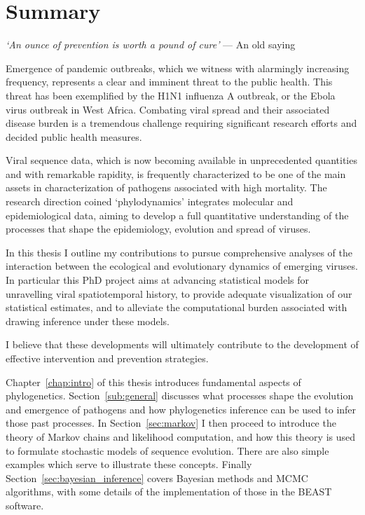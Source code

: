
\chapter*{Summary}

\bigskip{}

\emph{`An ounce of prevention is worth a pound  of cure'}
--- An old saying

\bigskip{}

Emergence of pandemic outbreaks, which we witness with alarmingly increasing frequency, represents a clear and imminent threat to the public health. 
This threat has been exemplified by the H1N1 influenza A outbreak, or the Ebola virus outbreak in West Africa.
Combating viral spread and their associated disease burden is a tremendous challenge requiring significant research efforts and decided public health measures. 

Viral sequence data, which is now becoming available in unprecedented quantities and with remarkable rapidity, is frequently characterized to be one of the main assets in characterization of pathogens associated with high mortality. 
The research direction coined `phylodynamics' integrates molecular and epidemiological data, aiming to develop a full quantitative understanding  of the processes that shape the epidemiology, evolution and spread of viruses.

In this thesis I outline my contributions to pursue comprehensive analyses of the interaction between the ecological and evolutionary dynamics of emerging viruses.
In particular this PhD project aims at advancing statistical models for unravelling viral spatiotemporal history, to provide adequate visualization of our statistical estimates, and to alleviate the computational burden associated with drawing inference under these models.

I believe that these developments will ultimately contribute to the development of effective intervention and prevention strategies. 

Chapter~\ref{chap:intro} of this thesis introduces fundamental aspects of phylogenetics.
Section~\ref{sub:general} discusses what processes shape the evolution and emergence of pathogens and how phylogenetics inference can be used to infer those past processes.
In Section~\ref{sec:markov} I then proceed to introduce the theory of Markov chains and likelihood computation, and how this theory is used to formulate stochastic models of sequence evolution. 
There are also simple examples which serve to illustrate these concepts.
Finally Section~\ref{sec:bayesian_inference} covers Bayesian methods and MCMC algorithms, with some details of the implementation of those in the BEAST software.

